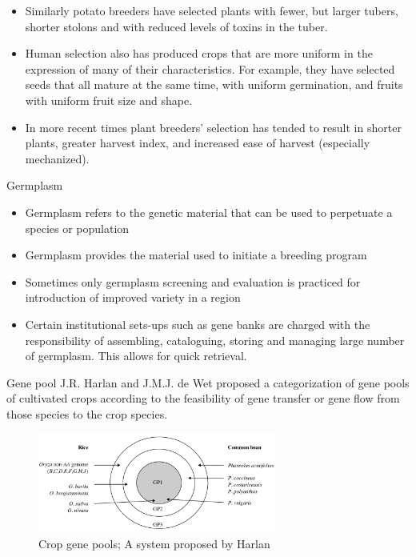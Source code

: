 \documentclass[11pt,ignorenonframetext,aspectratio=169]{beamer}
\begin{document}
\begin{frame}{}
\protect\hypertarget{section-5}{}
\begin{itemize}
\item
  Similarly potato breeders have selected plants with fewer, but larger
  tubers, shorter stolons and with reduced levels of toxins in the
  tuber.
\item
  Human selection also has produced crops that are more uniform in the
  expression of many of their characteristics. For example, they have
  selected seeds that all mature at the same time, with uniform
  germination, and fruits with uniform fruit size and shape.
\item
  In more recent times plant breeders' selection has tended to result in
  shorter plants, greater harvest index, and increased ease of harvest
  (especially mechanized).
\end{itemize}
\end{frame}

\begin{frame}{Germplasm}
\protect\hypertarget{germplasm}{}
\begin{itemize}
\item
  Germplasm refers to the genetic material that can be used to
  perpetuate a species or population
\item
  Germplasm provides the material used to initiate a breeding program
\item
  Sometimes only germplasm screening and evaluation is practiced for
  introduction of improved variety in a region
\item
  Certain institutional sets-ups such as gene banks are charged with the
  responsibility of assembling, cataloguing, storing and managing large
  number of germplasm. This allows for quick retrieval.
\end{itemize}
\end{frame}

\begin{frame}{Gene pool}
\protect\hypertarget{gene-pool}{}
J.R. Harlan and J.M.J. de Wet proposed a categorization of gene pools of
cultivated crops according to the feasibility of gene transfer or gene
flow from those species to the crop species.

\begin{figure}
\includegraphics[width=0.7\textwidth, keepaspectratio,height=0.6\textheight]{./images/crop_gene_pools} \caption{Crop gene pools; A system proposed by Harlan}\label{fig:gene-pools}
\end{figure}
\end{frame}
\end{document}
